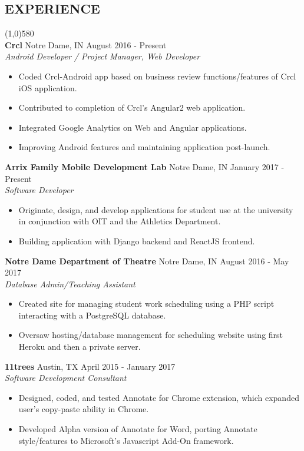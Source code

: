 \documentclass[10pt]{article}
\begin{document}
    
  \vspace{-8pt}
  \subsection*{\fontsize{10}{-10}\selectfont EXPERIENCE}
    \vspace{-16pt}
    \line(1,0){580}\\
    \textbf{Crcl}
    \tab
    Notre Dame, IN
    \hfill
    August 2016 - Present
    \\
    \textit{Android Developer / Project Manager, Web Developer}
    \begin{itemize}
      \item Coded Crcl-Android app based on business review functions/features of Crcl iOS application.
      \item Contributed to completion of Crcl's Angular2 web application.
      \item Integrated Google Analytics on Web and Angular applications.
      \item Improving Android features and maintaining application post-launch.
    \end{itemize}
    
    \textbf{Arrix Family Mobile Development Lab}
    \tab
    Notre Dame, IN
    \hfill
    January 2017 - Present
    \\
    \textit{Software Developer}
    \begin{itemize}
      \item Originate, design, and develop applications for student use at the university in conjunction with OIT and the Athletics Department.
      \item Building application with Django backend and ReactJS frontend.
    \end{itemize}
    
    \textbf{Notre Dame Department of Theatre}
    \tab
    Notre Dame, IN  
    \hfill
    August 2016 - May 2017
    \\
    \textit{Database Admin/Teaching Assistant}
    \begin{itemize}
      \item Created site for managing student work scheduling using a PHP script interacting with a PostgreSQL database.
      \item Oversaw hosting/database management for scheduling website using first Heroku and then a private server.
    \end{itemize}
    
    \textbf{11trees}
    \tab
    Austin, TX
    \hfill
    April 2015 - January 2017
    \\
    \textit{Software Development Consultant}
    \begin{itemize}
      \item Designed, coded, and tested Annotate for Chrome extension, which expanded user's copy-paste ability in Chrome.
      \item Developed Alpha version of Annotate for Word, porting Annotate style/features to Microsoft's Javascript Add-On framework.
    \end{itemize}
 
\end{document}

